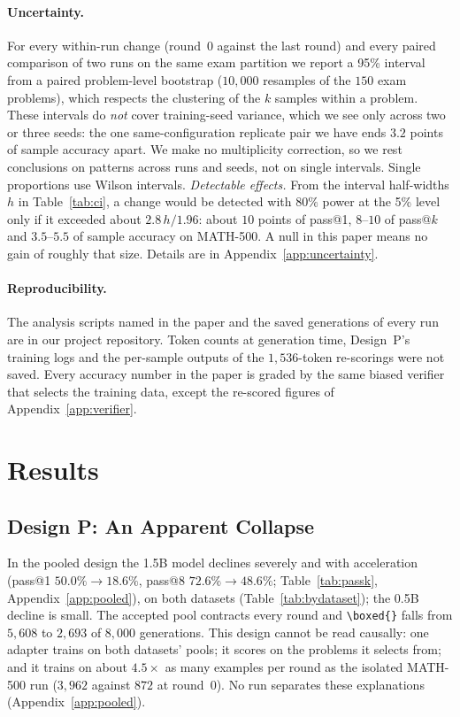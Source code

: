 \documentclass[runningheads]{llncs}
\begin{document}
\paragraph{Uncertainty.} For every within-run change (round~0 against the last
round) and every paired comparison of two runs on the same exam partition we
report a 95\% interval from a paired problem-level bootstrap ($10{,}000$
resamples of the $150$ exam problems), which respects the clustering of the $k$
samples within a problem. These intervals do \emph{not} cover training-seed
variance, which we see only across two or three seeds: the one
same-configuration replicate pair we have ends $3.2$ points of sample accuracy
apart. We make no multiplicity correction, so we rest conclusions on patterns
across runs and seeds, not on single intervals. Single proportions use Wilson
intervals. \emph{Detectable effects.} From the interval half-widths $h$ in
Table~\ref{tab:ci}, a change would be detected with $80\%$ power at the 5\%
level only if it exceeded about $2.8\,h/1.96$: about $10$ points of pass@1,
$8$--$10$ of pass@$k$ and $3.5$--$5.5$ of sample accuracy on MATH-500. A null
in this paper means no gain of roughly that size. Details are in
Appendix~\ref{app:uncertainty}.

\paragraph{Reproducibility.} The analysis scripts named in the paper and the
saved generations of every run are in our project repository. Token counts at
generation time, Design~P's training logs and the per-sample outputs of the
$1{,}536$-token re-scorings were not saved. Every accuracy number in the paper
is graded by the same biased verifier that selects the training data, except
the re-scored figures of Appendix~\ref{app:verifier}.

\section{Results}
\label{sec:results}

\subsection{Design P: An Apparent Collapse}
\label{sec:pooled}

In the pooled design the 1.5B model declines severely and with acceleration
(pass@1 $50.0\%\to18.6\%$, pass@8 $72.6\%\to48.6\%$; Table~\ref{tab:passk}, Appendix~\ref{app:pooled}),
on both datasets (Table~\ref{tab:bydataset}); the 0.5B decline is small. The
accepted pool contracts every round and \verb|\boxed{}| falls from $5{,}608$ to
$2{,}693$ of $8{,}000$ generations. This design cannot be read causally: one
adapter trains on both datasets' pools; it scores on the problems it selects
from; and it trains on about $4.5\times$ as many examples per round as the
isolated MATH-500 run ($3{,}962$ against $872$ at round~0). No run separates these
explanations (Appendix~\ref{app:pooled}).
\end{document}
